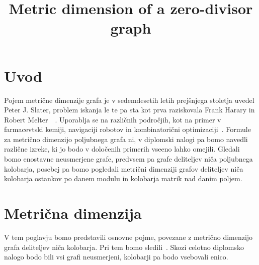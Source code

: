\documentclass[mat1, tisk]{fmfdelo}
\title{Metric dimension of a zero-divisor graph}
\begin{document}
\section{Uvod}


Pojem metrične dimenzije grafa je v sedemdesetih letih prejšnjega stoletja 
uvedel Peter J. Slater, problem iskanja le te pa sta kot prva raziskovala 
Frank Harary in Robert Melter~\cite{7dolzan}~\cite{4pirzada17}. Uporablja se 
na različnih področjih, kot na primer v farmacevtski kemiji, navigaciji 
robotov in kombinatorični optimizaciji~\cite{0OuSh}.
Formule za metrično dimenzijo poljubnega grafa ni, v diplomski nalogi 
pa bomo navedli različne izreke, ki jo bodo v določenih primerih vseeno 
lahko omejili. Gledali bomo enostavne 
neusmerjene grafe, predvsem pa grafe deliteljev niča poljubnega kolobarja, 
posebej pa bomo pogledali metrični dimenziji grafov deliteljev niča kolobarja 
ostankov po danem modulu in kolobarja matrik nad danim poljem.
%
%
\section{Metrična dimenzija}
V tem poglavju bomo predstavili osnovne pojme, povezane z metrično dimenzijo grafa 
deliteljev niča kolobarja. Pri tem bomo sledili~\cite{0OuSh}. Skozi celotno diplomsko nalogo 
bodo bili vsi grafi neusmerjeni, kolobarji pa bodo vsebovali enico.
%
\end{document}
